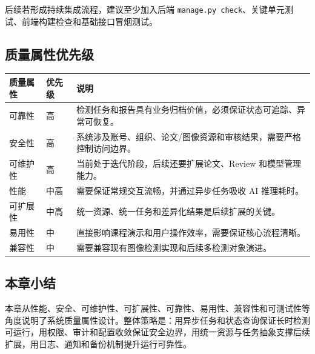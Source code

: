 后续若形成持续集成流程，建议至少加入后端 \texttt{manage.py check}、关键单元测试、前端构建检查和基础接口冒烟测试。

\subsection{质量属性优先级}
\begin{longtable}{|p{3cm}|p{2.2cm}|p{8.4cm}|}
\hline
质量属性 & 优先级 & 说明 \\ \hline
可靠性 & 高 & 检测任务和报告具有业务归档价值，必须保证状态可追踪、异常可恢复。 \\ \hline
安全性 & 高 & 系统涉及账号、组织、论文/图像资源和审核结果，需要严格控制访问边界。 \\ \hline
可维护性 & 高 & 当前处于迭代阶段，后续还要扩展论文、Review 和模型管理能力。 \\ \hline
性能 & 中高 & 需要保证常规交互流畅，并通过异步任务吸收 AI 推理耗时。 \\ \hline
可扩展性 & 中高 & 统一资源、统一任务和差异化结果是后续扩展的关键。 \\ \hline
易用性 & 中 & 直接影响课程演示和用户操作效率，需要保证核心流程清晰。 \\ \hline
兼容性 & 中 & 需要兼容现有图像检测实现和后续多检测对象演进。 \\ \hline
\end{longtable}

\subsection{本章小结}
本章从性能、安全、可维护性、可扩展性、可靠性、易用性、兼容性和可测试性等角度说明了系统质量属性设计。整体策略是：用异步任务和状态查询保证长时检测可运行，用权限、审计和配置收敛保证安全边界，用统一资源与任务抽象支撑后续扩展，用日志、通知和备份机制提升运行可靠性。
